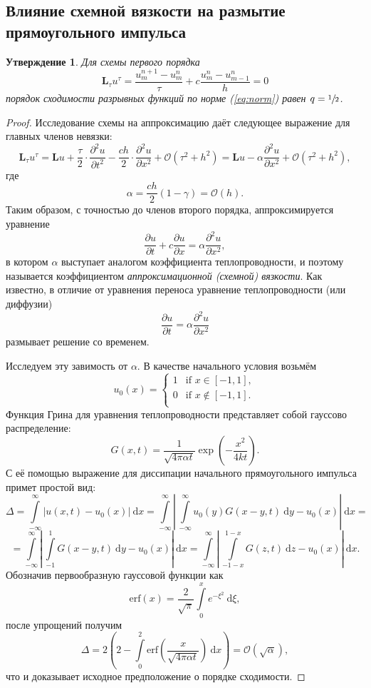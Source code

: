 \documentclass[a4paper,10pt]{article}
\newcommand{\dd}{\:\mathrm{d}}
\begin{document}
\subsection{Влияние схемной вязкости на размытие прямоугольного импульса}\label{sec:viscosity}
\newtheorem{schemevis}{Утверждение}
\begin{schemevis}
Для схемы первого порядка
\[ \mathbf{L}_\tau u^\tau = \frac{u_m^{n+1}-u_m^n}{\tau} + c\frac{u_m^n-u_{m-1}^n}{h}=0 \]
порядок сходимости разрывных функций по норме (\ref{eq:norm}) равен \( q=\sfrac1{2} \).
\end{schemevis}
\begin{proof}
Исследование схемы на аппроксимацию даёт следующее выражение для главных членов невязки:
\[	\mathbf{L}_\tau u^\tau = \mathbf{L}u+\frac\tau2\cdot\frac{\partial^2u}{\partial t^2} - 
		\frac{ch}2\cdot\frac{\partial^2u}{\partial x^2} + \mathcal{O}(\tau^2 + h^2) = 
	\mathbf{L}u-\alpha\frac{\partial^2u}{\partial x^2} + \mathcal{O}(\tau^2 + h^2), \]
где \[ \alpha = \frac{ch}2(1-\gamma) = \mathcal{O}(h). \]
Таким образом, с точностью до членов второго порядка, аппроксимируется уравнение
\[ \frac{\partial u}{\partial t} + c\frac{\partial u}{\partial x} = \alpha\frac{\partial^2 u}{\partial x^2}, \]
в котором \( \alpha \) выступает аналогом коэффициента теплопроводности, и поэтому называется коэффициентом \textit{аппроксимационной (схемной) вязкости}.
Как известно, в отличие от уравнения переноса уравнение теплопроводности (или диффузии)
\[ \frac{\partial u}{\partial t} = \alpha\frac{\partial^2 u}{\partial x^2} \]
размывает решение со временем. 

Исследуем эту завимость от \( \alpha \). В качестве начального условия возьмём
\[ u_0(x) = 
  \begin{cases}
    1 & \text{if } x \in [-1,1],\\
    0 & \text{if } x \notin [-1,1].\\
  \end{cases} \]
Функция Грина для уравнения теплопроводности представляет собой гауссово распределение:
\[ G(x,t) = \frac1{\sqrt{4\pi\alpha t}}\exp\left(-\frac{x^2}{4kt}\right). \]
С её помощью выражение для диссипации начального прямоугольного импульса примет простой вид:
\[	\Delta = \int\limits_{-\infty}^\infty\left|u(x,t)-u_0(x)\right| \dd x =
		\int\limits_{-\infty}^\infty\left|\,\int\limits_{-\infty}^\infty u_0(y)G(x-y,t)\dd y-u_0(x)\right| \dd x = \]
	\[ =\int\limits_{-\infty}^\infty\left|\,\int\limits_{-1}^1 G(x-y,t)\dd y-u_0(x)\right| \dd x =
		\int\limits_{-\infty}^\infty\left|\,\int\limits_{-1-x}^{1-x} G(z,t)\dd z-u_0(x)\right| \dd x. \]
Обозначив первообразную гауссовой функции как
\[ \mathrm{erf}(x) = \frac2{\sqrt\pi}\int\limits_0^x e^{-\xi^2} \dd \xi, \]
после упрощений получим
\[ \Delta = 2\left(2-\int\limits_0^2 \mathrm{erf}\left(\frac{x}{\sqrt{4\pi\alpha t}}\right) \dd x\right) = \mathcal{O}(\sqrt\alpha), \]
что и доказывает исходное предположение о порядке сходимости.
\end{proof}
\end{document}
